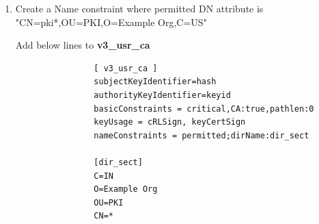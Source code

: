 \documentclass[a4paper]{article}
\begin{document}
\begin{enumerate}[label*=\arabic*.]
        Add below line to \textbf{server\_cert} section and create a new section \textbf{alt\_names}
        \begin{lstlisting}
             [ server_cert ]
             subjectAltName = @alt_names

            [alt_names]
            DNS.1 = *.example.org
       \end{lstlisting}

        \item Create a Name constraint where permitted DN attribute is "CN=pki*,OU=PKI,O=Example Org,C=US"

            Add below lines to \textbf{v3\_usr\_ca} 
            \begin{lstlisting}
                [ v3_usr_ca ]
                subjectKeyIdentifier=hash
                authorityKeyIdentifier=keyid
                basicConstraints = critical,CA:true,pathlen:0
                keyUsage = cRLSign, keyCertSign
                nameConstraints = permitted;dirName:dir_sect

                [dir_sect]
                C=IN
                O=Example Org
                OU=PKI
                CN=*
            \end{lstlisting}
\end{enumerate}
\end{document}
